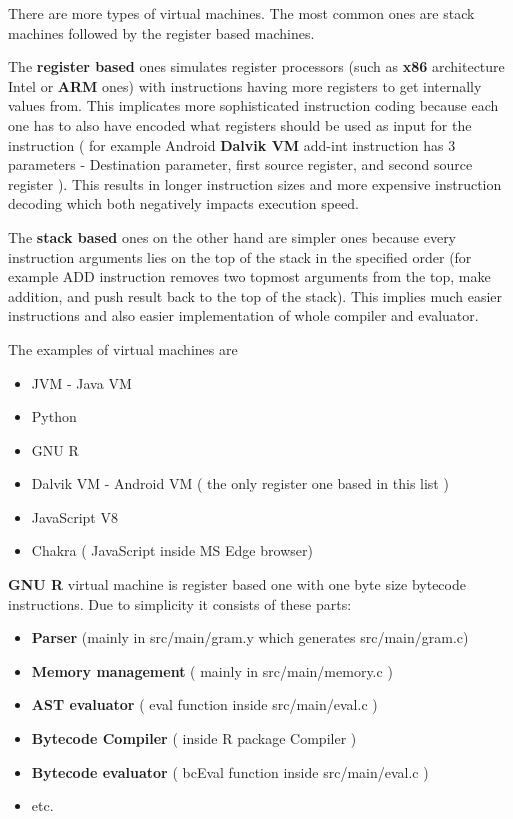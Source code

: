 \documentclass[thesis=M,english]{FITthesis}[2018/10/20]
\begin{document}
There are more types of virtual machines. The most common ones are stack machines followed by the register based machines.

The \textbf{register based} ones simulates register processors (such as \textbf{x86} architecture Intel or \textbf{ARM} ones) with instructions having more registers to get internally values from. This implicates more sophisticated instruction coding because each one has to also have encoded what registers should be used as input for the instruction ( for example Android \textbf{Dalvik VM} add-int instruction has 3 parameters - Destination parameter, first source register, and second source register ). This results in longer instruction sizes and more expensive instruction decoding which both negatively impacts execution speed.

The \textbf{stack based} ones on the other hand are simpler ones because every instruction arguments lies on the top of the stack in the specified order (for example ADD instruction removes two topmost arguments from the top, make addition, and push result back to the top of the stack). This implies much easier instructions and also easier implementation of whole compiler and evaluator.

The examples of virtual machines are
\begin{itemize}
	\item JVM - Java VM
	\item Python
	\item GNU R
	\item Dalvik VM - Android VM ( the only register one based in this list )
	\item JavaScript V8
	\item Chakra ( JavaScript inside MS Edge browser)
\end{itemize}



\textbf{GNU R} virtual machine is register based one with one byte size bytecode instructions. Due to simplicity it consists of these parts:
\begin{itemize}
	\item \textbf{Parser} (mainly in src/main/gram.y which generates src/main/gram.c)
	\item \textbf{Memory management} ( mainly in src/main/memory.c )
	\item \textbf{AST evaluator} ( eval function inside src/main/eval.c )
	\item \textbf{Bytecode Compiler} ( inside R package Compiler )
	\item \textbf{Bytecode evaluator} ( bcEval function inside src/main/eval.c )
	\item etc.
\end{itemize}
\end{document}
